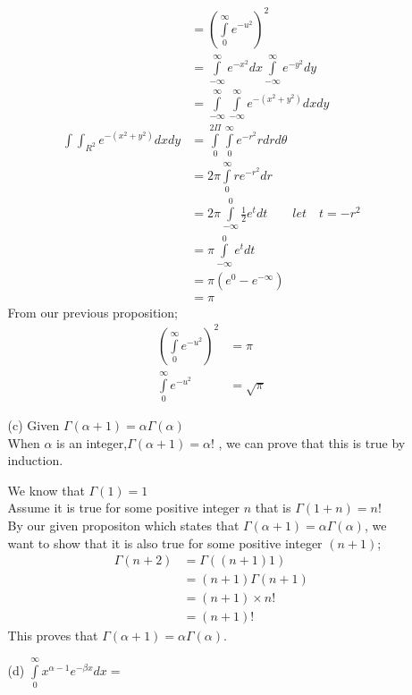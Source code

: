 \documentclass[12pt,a4paper]{article}
\begin{document}
\begin{itemize}
\begin{itemize}
\begin{align*}
&=\left( \int\limits_0^\infty e^{-u^{2}}\right)^{2}\\
&= \int\limits_{- \infty}^\infty e^{-x^{2}}dx \int\limits_{- \infty}^\infty e^{-y^{2}}dy\\
&=\int\limits_{- \infty}^\infty \int\limits_{- \infty}^\infty e^{-\left(x^{2}+y^{2}\right)}  dxdy\\
\int \int_{R^{2}} e^{-\left(x^{2}+y^{2}\right)}dxdy
&=\int\limits_{0}^{2\Pi} \int\limits_{0}^{\infty} e^{-r^{2}}r dr d\theta\\
&=2\pi \int\limits_{0}^{\infty} re^{-r^{2}}dr\\
&=2\pi\int\limits_{- \infty}^{0} \frac{1}{2} e^{t} dt \quad \quad let \quad t=-r^{2}\\
&=\pi\int\limits_{- \infty}^{0} e^{t}dt\\
&=\pi \left(e^{0}-e^{-\infty}\right)\\
&=\pi
\end{align*}
From our previous proposition;\\
\begin{align*}
\left( \int\limits_0^\infty e^{-u^{2}}\right)^{2}&=\pi\\
\int\limits_{0}^\infty e^{-u^{2}}&=\sqrt{\pi}
\end{align*}


\item[(c)] Given  $ \Gamma \left( \alpha + 1 \right)= \alpha \Gamma \left( \alpha \right)$\\
When $\alpha$ is an integer,\quad $ \Gamma \left( \alpha + 1 \right)= \alpha ! $ , we can prove that this is true by induction.

We know that $ \Gamma \left(1\right)=1$
\\ Assume it is true for some positive integer $n$ that is $ \Gamma \left(1+n\right)=n!$\\
By our given propositon which states that $ \Gamma \left( \alpha + 1 \right)= \alpha \Gamma \left( \alpha \right)$, we want to show that it is also true for some positive integer $\left(n+1\right)$;\\
\begin{align*}
\Gamma \left( n + 2 \right) &= \Gamma \left( \left( n + 1 \right) 1 \right)\\
&=\left(n+1\right)\Gamma \left(n+ 1 \right)\\
&=\left(n+ 1 \right)\times n!\\
&=\left(n+ 1 \right)!
\end{align*}
This proves that $ \Gamma \left( \alpha + 1 \right)= \alpha \Gamma \left( \alpha \right)$.
\item[(d)] $ \int\limits_0^\infty {x^{\alpha - 1} e^{ -\beta x} dx}=$


\end{itemize}
\end{itemize}
\end{document}
